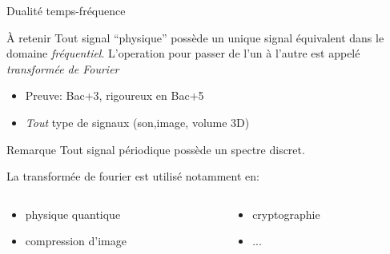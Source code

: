 \documentclass{beamer}
\begin{document}
\begin{frame}{Dualité temps-fréquence}
  \begin{alertblock}{À retenir}
    Tout signal ``physique'' possède un unique signal équivalent dans le domaine \emph{fréquentiel}. L'operation pour passer de l'un à l'autre est appelé \emph{transformée de Fourier}
  \end{alertblock}
  \begin{itemize}[<+->]
    \item Preuve: Bac+3, rigoureux en Bac+5
    \item \emph{Tout} type de signaux (son,image, volume 3D)
  \end{itemize}\pause
  \begin{block}{Remarque}
    Tout signal périodique possède un spectre discret.
  \end{block}\pause
  La transformée de fourier est utilisé notamment en:
  \begin{columns}
    \begin{column}{0.5\textwidth}
      \begin{itemize}[<+->]
        \item physique quantique
        \item compression d'image
      \end{itemize}
    \end{column}
    \begin{column}{0.5\textwidth}
      \begin{itemize}[<+->]
        \item cryptographie
        \item ...
      \end{itemize}
    \end{column}
  \end{columns}

\end{frame}
\end{document}
